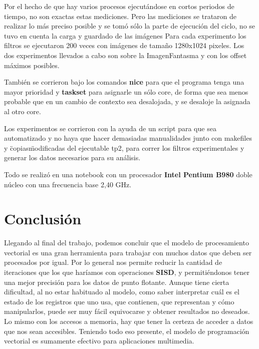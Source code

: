 \documentclass[a4paper]{article}
\begin{document}
Por el hecho de que hay varios procesos ejecutándose en cortos periodos de tiempo, no son exactas estas mediciones. Pero las mediciones se trataron de realizar lo más preciso posible y se tomó sólo la parte de ejecución del ciclo, no se tuvo en cuenta la carga y guardado de las imágenes Para cada experimento los filtros se ejecutaron 200 veces con imágenes de tamaño 1280x1024 pixeles. 
Los dos experimentos llevados a cabo son sobre la ImagenFantasma y con los offset máximos posibles.

También se corrieron bajo los comandos \textbf{nice} para que el programa tenga una mayor prioridad y \textbf{taskset} para asignarle un sólo core, de forma que sea menos probable que en un cambio de contexto sea desalojada, y se desaloje la asignada al otro core.

Los experimentos se corrieron con la ayuda de un script para que sea automatizado y no haya que hacer demasiadas manualidades junto con makefiles y \"copias\" modificadas del ejecutable tp2, para correr los filtros experimentales y generar los datos necesarios para su análisis. 

Todo se realizó en una notebook con un procesador \textbf{Intel Pentium B980} doble núcleo con una frecuencia base 2,40 GHz.



    

\section{Conclusión}
Llegando al final del trabajo, podemos concluir que el modelo de procesamiento vectorial es una gran herramienta para trabajar con muchos datos que deben ser procesados por igual. Por lo general nos permite reducir la cantidad de iteraciones que los que haríamos con operaciones \textbf{SISD}, y permitiéndonos tener una mejor precisión para los datos de punto flotante. 
Aunque tiene cierta dificultad, al no estar habituado al modelo, como saber interpretar cuál es el estado de los registros que uno usa, que contienen, que representan y cómo manipularlos, puede ser muy fácil equivocarse y obtener resultados no deseados. Lo mismo con los accesos a memoria, hay que tener la certeza de acceder a datos que nos sean accesibles.
Teniendo todo eso presente, el modelo de programación vectorial es sumamente efectivo para aplicaciones multimedia.
\end{document}
